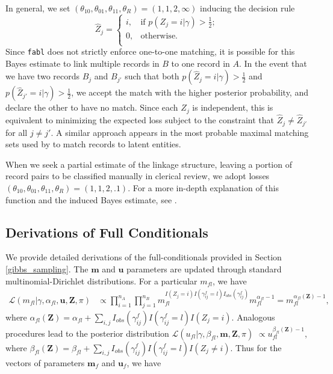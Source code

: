 \documentclass[ba]{imsart}
\begin{document}
In general, we set $(\theta_{10}, \theta_{01}, \theta_{11}, \theta_R) = (1, 1, 2, \infty)$ inducing the decision rule
	$$\hat{Z}_j =\begin{cases} 
		i,  & \text{if } p(Z_j = i |\gamma) > \frac{1}{2}; \\
		0,  & \text{otherwise}. \\
	\end{cases}$$
Since \texttt{fabl} does not strictly enforce one-to-one matching, it is possible for this Bayes estimate to link multiple records in $B$ to one record in $A$. In the event that we have two records $B_j$ and $B_{j'}$ such that both $p(\hat{Z}_j = i |\gamma) > \frac{1}{2}$ and $ p(\hat{Z}_{j'} = i |\gamma) > \frac{1}{2}$, we accept the match with the higher posterior probability, and declare the other to have no match. Since each $Z_j$ is independent, this is equivalent to minimizing the expected loss subject to the constraint that $\hat{Z}_j \neq \hat{Z}_{j'}$ for all $j \neq j'$.  A similar approach appears in the most probable maximal matching sets used by \cite{steorts_bayesian_2016} to match records to latent entities.

When we seek a partial estimate of the linkage structure, leaving a portion of record pairs to be classified manually in clerical review, we adopt losses $(\theta_{10}, \theta_{01}, \theta_{11}, \theta_R) = (1, 1, 2, .1)$. For a more in-depth explanation of this function and the induced Bayes estimate, see \cite{sadinle_bayesian_2017}.
	
	
	\hypertarget{app:derivations}{%
	\subsection{Derivations of Full Conditionals}\label{app:derivations}}

We provide detailed derivations of the full-conditionals provided in Section \ref{gibbs_sampling}. The $\bm{m}$ and $\bm{u}$ parameters are updated through standard multinomial-Dirichlet distributions. For a particular $m_{fl}$, we have
\begin{align*}
	\mathcal{L}(m_{fl}|\gamma, \alpha_{fl}, \bm{u}, \bm{Z}, \pi) &\propto \prod_{i=1}^{n_A} \prod_{j=1}^{n_B} m_{fl}^{I(Z_j = i) I(\gamma_{ij}^f = l) I_{obs}(\gamma_{ij}^f)}  m_{fl}^{\alpha_{fl} - 1} = m_{fl}^{\alpha_{fl}(\bm{Z}) - 1},
\end{align*}
where $\alpha_{fl}(\bm{Z})= \alpha_{fl} + \sum_{i,j} I_{obs}(\gamma_{ij}^f)I(\gamma_{ij}^f = l) I(Z_j = i)$. Analogous procedures lead to the posterior distribution $\mathcal{L}(u_{fl}| \gamma, \beta_{fl}, \bm{m}, \bm{Z}, \pi)$  $\propto u_{fl}^{\beta_{fl}(\bm{Z}) - 1}$, where $\beta_{fl}(\bm{Z})= \beta_{fl} + \sum_{i,j} I_{obs}(\gamma_{ij}^f)I(\gamma_{ij}^f = l) I(Z_j \neq i)$. Thus for the vectors of parameters $\bm{m}_f$ and $\bm{u}_f$, we have
\end{document}
